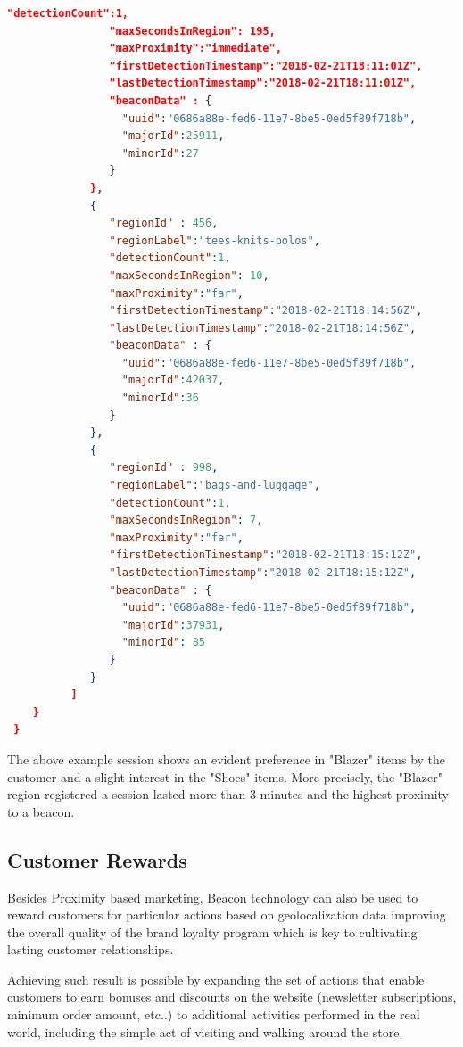 \begin{lstlisting}[language=json,firstnumber=1]
                "detectionCount":1,
                "maxSecondsInRegion": 195,
                "maxProximity":"immediate",
                "firstDetectionTimestamp":"2018-02-21T18:11:01Z",
                "lastDetectionTimestamp":"2018-02-21T18:11:01Z",
                "beaconData" : {
                  "uuid":"0686a88e-fed6-11e7-8be5-0ed5f89f718b",
                  "majorId":25911,
                  "minorId":27
                }
             },
             {
                "regionId" : 456,
                "regionLabel":"tees-knits-polos",
                "detectionCount":1,
                "maxSecondsInRegion": 10,
                "maxProximity":"far",
                "firstDetectionTimestamp":"2018-02-21T18:14:56Z",
                "lastDetectionTimestamp":"2018-02-21T18:14:56Z",
                "beaconData" : {
                  "uuid":"0686a88e-fed6-11e7-8be5-0ed5f89f718b",
                  "majorId":42037,
                  "minorId":36
                }
             },
             {
                "regionId" : 998,
                "regionLabel":"bags-and-luggage",
                "detectionCount":1,
                "maxSecondsInRegion": 7,
                "maxProximity":"far",
                "firstDetectionTimestamp":"2018-02-21T18:15:12Z",
                "lastDetectionTimestamp":"2018-02-21T18:15:12Z",
                "beaconData" : {
                  "uuid":"0686a88e-fed6-11e7-8be5-0ed5f89f718b",
                  "majorId":37931,
                  "minorId": 85
                }
             }
          ]
    }
 }
  \end{lstlisting}
\vspace{0.5cm}


The above example session shows an evident preference in "Blazer" items by the customer and a slight interest in the "Shoes" items. More precisely, the "Blazer" region registered a session lasted more than 3 minutes and the highest proximity to a beacon.  

\subsection{Customer Rewards}

Besides Proximity based marketing, Beacon technology can also be used to reward customers for particular actions based on geolocalization data improving the overall quality of the brand loyalty program which is key to cultivating lasting customer relationships. 

Achieving such result is possible by expanding the set of actions that enable customers to earn bonuses and discounts on the website (newsletter subscriptions, minimum order amount, etc..) to additional activities performed in the real world, including the simple act of visiting and walking around the store.

